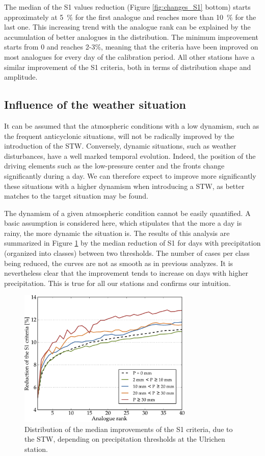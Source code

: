 \documentclass[hess]{copernicus}
\begin{document}
The median of the S1 values reduction (Figure \ref{fig:changes_S1} bottom) starts approximately at 5~\% for the first analogue and reaches more than 10~\% for the last one. This increasing trend with the analogue rank can be explained by the accumulation of better analogues in the distribution. The minimum improvement starts from 0 and reaches 2-3\%, meaning that the criteria have been improved on most analogues for every day of the calibration period. All other stations have a similar improvement of the S1 criteria, both in terms of distribution shape and amplitude.


\subsection{Influence of the weather situation}
\label{sec:influence_precip}

It can be assumed that the atmospheric conditions with a low dynamism, such as the frequent anticyclonic situations, will not be radically improved by the introduction of the STW. Conversely, dynamic situations, such as weather disturbances, have a well marked temporal evolution. Indeed, the position of the driving elements such as the low-pressure center and the fronts change significantly during a day. We can therefore expect to improve more significantly these situations with a higher dynamism when introducing a STW, as better matches to the target situation may be found.

The dynamism of a given atmospheric condition cannot be easily quantified. A basic assumption is considered here, which stipulates that the more a day is rainy, the more dynamic the situation is. The results of this analysis are summarized in Figure \ref{fig:changes_S1_precip_threshold} by the median reduction of S1 for days with precipitation (organized into classes) between two thresholds. The number of cases per class being reduced, the curves are not as smooth as in previous analyzes. It is nevertheless clear that the improvement tends to increase on days with higher precipitation. This is true for all our stations and confirms our intuition.

\begin{figure}[htb]
	\begin{center}
		\includegraphics[width=8.3cm]{figures/changes_S1_precip_threshold.pdf}
	\end{center}
	\caption{Distribution of the median improvements of the S1 criteria, due to the STW, depending on precipitation thresholds at the Ulrichen station.}
	\label{fig:changes_S1_precip_threshold}
\end{figure}
\end{document}

